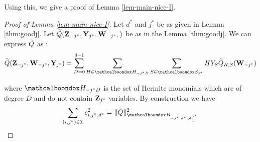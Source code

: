 Using this, we give a proof of Lemma \ref{lem-main-nice-I}.
\begin{proof}[Proof of Lemma \ref{lem-main-nice-I}]
	Let $d^*$ and $j^*$ be as given in Lemma \ref{thm:goodj}. Let $\Wq({\bf Z}_{-j^*},{\bf Y}_{j^*},{\bf W}_{-j^*},)$ be as in the Lemma \ref{thm:goodj}. We can express $\widetilde{Q}$ as :	
	\begin{equation}				\label{eqn:Qtilde_defn}
	\Wq({\bf Z}_{-j^*},{\bf W}_{-j^*},{\bf Y}_{j^*}) = \sum_{D = 0}^{d-1}\sum_{H \in \mcb{H}_{-j^*D}}\sum_{S \in \mcb{S}_{j^*}}HY_S\Wq_{H,S}({\bf W}_{-j^*})
	\end{equation}
	

	\noindent where $\mcb{H}_{-j^*D}$ is the set of Hermite monomials which are of degree $D$ and do not contain ${\bf Z}_{j^*}$ variables. By construction we have
	\begin{equation}					\label{eq:c_sum1}
	\sum_{(i,j^*) \in \mc{I}} c_{i,j^*,d^*}^2  = \| \Wq\|^2_{\mcb{B}_{-j^*,d^*,\mc{A}^{j^*}_1}}
	\end{equation}
	

\end{proof}
